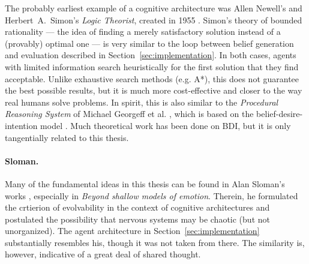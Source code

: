 The probably earliest example of a cognitive architecture was Allen Newell's and Herbert~A.~Simon's {\em Logic Theorist}, created in 1955 \cite[p. 44]{crevier93}. Simon's theory of bounded rationality \cite{Gigerenzer2001} --- the idea of finding a merely satisfactory solution instead of a (provably) optimal one --- is very similar to the loop between belief generation and evaluation described in Section~\ref{sec:implementation}. In both cases, agents with limited information search heuristically for the first solution that they find acceptable. Unlike exhaustive search methods (e.g. A*), this does not guarantee the best possible results, but it is much more cost-effective and closer to the way real humans solve problems. In spirit, this is also similar to the {\em Procedural Reasoning System} of Michael Georgeff et al. \cite{pcs}, which is based on the belief-desire-intention model \cite{Rao95bdiagents, Bratman87}. Much theoretical work has been done on BDI, but it is only tangentially related to this thesis.

\paragraph{Sloman.} Many of the fundamental ideas in this thesis can be found in Alan Sloman's works \cite{sloman1993, sloman1997, sloman1999, sloman2000, slomanSimAgent}, especially in {\em Beyond shallow models of emotion}. Therein, he formulated the crtierion of evolvability in the context of cognitive architectures and postulated the possibility that nervous systems may be chaotic (but not unorganized). The agent architecture in Section~\ref{sec:implementation} substantially resembles his, though it was not taken from there. The similarity is, however, indicative of a great deal of shared thought.

